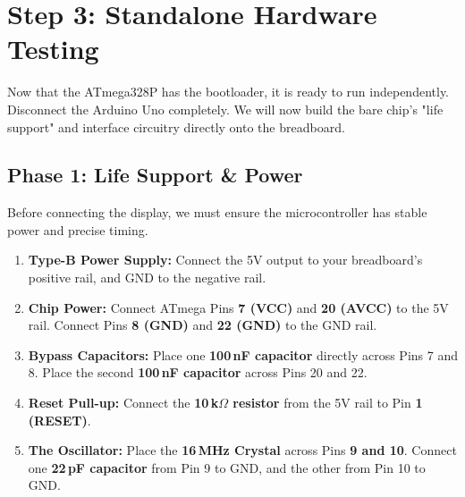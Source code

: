 \documentclass[11pt,a4paper]{article}
\begin{document}
\section{Step 3: Standalone Hardware Testing}
Now that the ATmega328P has the bootloader, it is ready to run independently. Disconnect the Arduino Uno completely. We will now build the bare chip's "life support" and interface circuitry directly onto the breadboard.

\subsection*{Phase 1: Life Support \& Power}
Before connecting the display, we must ensure the microcontroller has stable power and precise timing.
\begin{enumerate}
    \item \textbf{Type-B Power Supply:} Connect the 5V output to your breadboard's positive rail, and GND to the negative rail.
    \item \textbf{Chip Power:} Connect ATmega Pins \textbf{7 (VCC)} and \textbf{20 (AVCC)} to the 5V rail. Connect Pins \textbf{8 (GND)} and \textbf{22 (GND)} to the GND rail.
    \item \textbf{Bypass Capacitors:} Place one \textbf{100\,nF capacitor} directly across Pins 7 and 8. Place the second \textbf{100\,nF capacitor} across Pins 20 and 22.
    \item \textbf{Reset Pull-up:} Connect the \textbf{10\,k$\Omega$ resistor} from the 5V rail to Pin \textbf{1 (RESET)}.
    \item \textbf{The Oscillator:} Place the \textbf{16\,MHz Crystal} across Pins \textbf{9 and 10}. Connect one \textbf{22\,pF capacitor} from Pin 9 to GND, and the other from Pin 10 to GND.
\end{enumerate}
\end{document}

